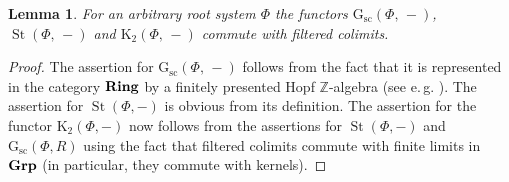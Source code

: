 \documentclass[oneside, 11pt]{amsart} \pdfoutput=1
\newcommand{\K}{{\mathrm{K}}}
\newcommand{\St}{\mathop{\mathrm{St}}\nolimits}
\newcommand{\Gsc}{\mathrm{G}_\mathrm{sc}}
\numberwithin{equation}{section}
\newtheorem{lemma}{Lemma} \numberwithin{lemma}{section}
\theoremstyle{definition}
\newcommand{\ZZ}{\mathbb{Z}}
\newcommand{\catname}[1]{{\normalfont\textbf{#1}}} %
\begin{document}
\begin{lemma} \label{k2cdc} 
For an arbitrary root system $\Phi$ the functors $\Gsc(\Phi,\,-)$, $\St(\Phi,\,-)$ and $\K_2(\Phi,\,-)$ commute with filtered colimits.
\end{lemma}
\begin{proof}
The assertion for $\mathrm G_{\mathrm{sc}}(\Phi,\,-)$ follows from the fact that it is represented in the category $\catname{Ring}$ by a finitely presented Hopf $\ZZ$-algebra (see e.\,g. \cite[Lemma~10.127.3]{stacks-project}). The assertion for $\St(\Phi, -)$ is obvious from its definition. The assertion for the functor $\K_2(\Phi, -)$ now follows from the assertions for $\St(\Phi, -)$ and $\Gsc(\Phi, R)$ using the fact that filtered colimits commute with finite limits in $\catname{Grp}$ (in particular, they commute with kernels).
\end{proof}
\end{document}
